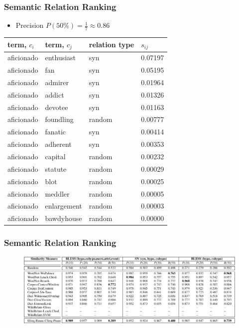 \documentclass{beamer}
\begin{document}
\begin{frame}
\frametitle{Semantic Relation Ranking}

\begin{itemize}
	\item Precision $P(50\%)= \frac{1}{7} \approx 0.86 $
\end{itemize}

\begin{table}[h]\footnotesize
\begin{tabular}{ |l|l|l|l| }
\hline
 term, $c_i$ &  term, $c_j$ & relation type & \bf $s_{ij}$ \\ \hline \hline

aficionado & enthusiast & syn & 0.07197 \\
aficionado & fan & syn & 0.05195 \\
aficionado & admirer & syn & 0.01964 \\
aficionado & addict & syn & 0.01326 \\
aficionado & devotee & syn & 0.01163 \\
aficionado & foundling & random & 0.00777 \\
aficionado & fanatic & syn & 0.00414 \\ \hline
aficionado & adherent & syn & 0.00353 \\
aficionado & capital & random & 0.00232 \\
aficionado & statute & random & 0.00029 \\
aficionado & blot & random & 0.00025 \\
aficionado & meddler & random & 0.00005 \\
aficionado & enlargement & random &	0.00003 \\
aficionado & bawdyhouse & random & 	0.00000 \\ 
\hline
\end{tabular}
\end {table}

\end{frame}

\begin{frame}
\frametitle{Semantic Relation Ranking}

\begin{figure}	
	\centering
	\includegraphics[width=1.0\textwidth]{figures/res-relations-mlg}
\end{figure}

\end{frame}
\end{document}

